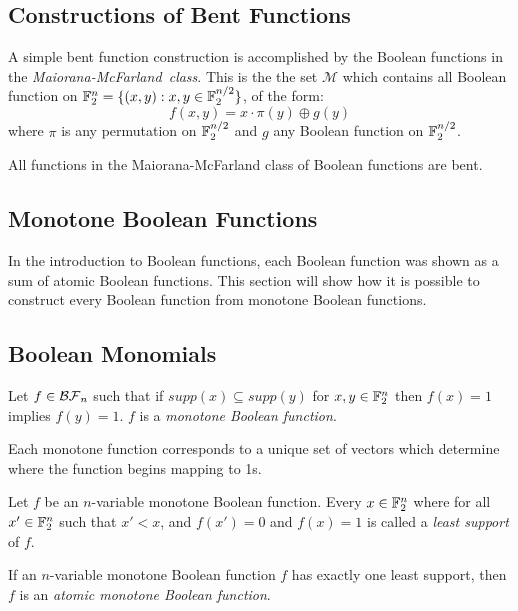
\subsection{Constructions of Bent Functions}
\par A simple bent function construction is accomplished by the Boolean
functions in the {\em Maiorana-McFarland\ class}. This is the the set
$\mathcal{M}$ which contains all Boolean function on
$\mathbb{F}_2^n=\{(x,y):x,y\in\mathbb{F}_2^{n/2}\}$, of the form:
  \[
  f(x,y)=x\cdot\pi(y)\oplus g(y)
  \]
where $\pi$ is any permutation on $\mathbb{F}_2^{n/2}$ and $g$ any Boolean
function on $\mathbb{F}_2^{n/2}$.

\par All functions in the Maiorana-McFarland class of Boolean functions are
bent.


\subsection{Monotone Boolean Functions}
\par In the introduction to Boolean functions, each Boolean function was
shown as a sum of atomic Boolean functions. This section will show how it is
possible to construct every Boolean function from monotone Boolean
functions.

\subsection{Boolean Monomials}
\begin{definition}
  Let $f\in\mathcal{BF}_n$ such that if $supp(x)\subseteq supp(y)$ for
  $x,y\in\mathbb{F}_2^n$ then $f(x)=1$ implies $f(y)=1$. $f$ is a \textit{monotone
  Boolean function}.
\end{definition}

\par Each monotone function corresponds to a unique set of vectors which
determine where the function begins mapping to 1s.

\begin{definition}
  Let $f$ be an $n$-variable monotone Boolean function. Every $x\in\mathbb{F}_2^n$
  where for all $x'\in\mathbb{F}_2^n$ such that $x'<x$, and $f(x')=0$ and
  $f(x)=1$ is called a \textit{least support} of $f$.
\end{definition}

\begin{definition}
  If an $n$-variable monotone Boolean function $f$ has exactly one least
  support, then $f$ is an \textit{atomic monotone Boolean function}.
\end{definition}

